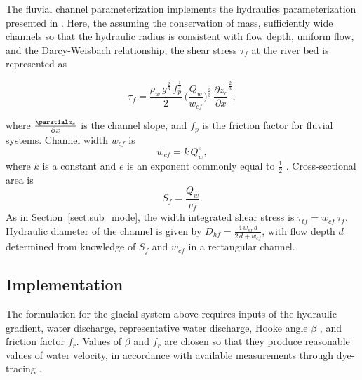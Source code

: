 \documentclass[11pt]{article}
\begin{document}
\begin{spacing}{1}
          The fluvial channel parameterization implements the hydraulics parameterization presented in \citet{tucker1997}.
          Here, the assuming the conservation of mass, sufficiently wide channels so that the hydraulic radius is consistent with flow depth, uniform flow, and the Darcy-Weisbach relationship,
          the shear stress $\tau_f$ at the river bed is represented as
          \begin{linenomath*}
            \begin{equation}
              \label{eq:DW_tau}
              \tau_f=\frac{\rho_w\,g^{\frac{2}{3}}\,f_p^{\frac{1}{3}}}{2}\, \Big(\frac{Q_w}{w_{cf}} \Big)^{\frac{2}{3}} \,\frac{\partial z_c}{\partial x}^{\frac{2}{3}},
            \end{equation}
          \end{linenomath*}
          where $\frac{\paratial z_c}{\partial x}$ is the channel slope, and $f_p$ is the friction factor for fluvial systems.
          Channel width $w_{cf}$ is 
          \begin{equation}
            \label{eq:wcf}
            w_{cf} = k \, Q_w^e,
          \end{equation}
          where $k$ is a constant and $e$ is an exponent commonly equal to $\frac{1}{2}$ \citep{leopold1953}. Cross-sectional area is 
          \begin{equation}
            \label{eq:Sf}
            S_f= \frac{Q_w}{v_f}.
          \end{equation}
          As in Section~\ref{sect:sub_mode}, the width integrated shear stress is $\tau_{tf}=w_{cf}\,\tau_f$.
          Hydraulic diameter of the channel is given by $D_{hf} = \frac{4\,w_{cf}\,d}{2\,d+w_{cf}}$, with flow depth $d$ determined from knowledge of $S_f$ and $w_{cf}$ in a rectangular channel.
          
          \subsection{Implementation}
        
          The formulation for the glacial system above requires inputs of the hydraulic gradient, water discharge, representative water discharge, Hooke angle $\beta$ \citep{hooke1990}, and friction factor $f_r$.
          Values of $\beta$ and $f_r$ are chosen so that they produce reasonable values of water velocity, in accordance with available measurements through dye-tracing \citep[Section~\ref{sect:sub_mode}, Figure~\ref{fig:model_outs}; e.g.][]{werder2010}.
          

\end{spacing}
\end{document}
